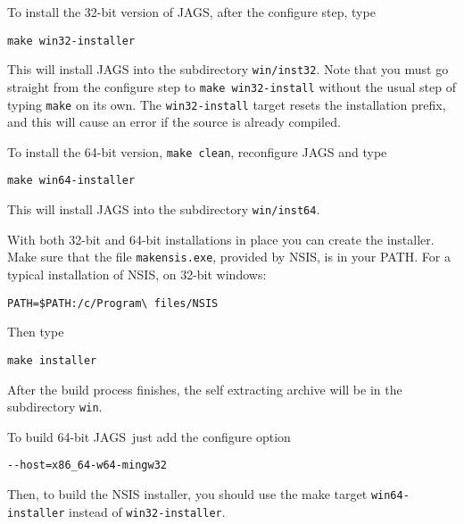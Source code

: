 \documentclass[11pt, a4paper, titlepage]{article}
\newcommand{\JAGS}{\textsf{JAGS}}
\begin{document}
To install the 32-bit version of JAGS, after the configure step, type
\begin{verbatim}
make win32-installer
\end{verbatim}
This will install JAGS into the subdirectory \verb+win/inst32+.
Note that you must go straight from the configure step to \texttt{make
  win32-install} without the usual step of typing \texttt{make} on
its own.  The \texttt{win32-install} target resets the installation
prefix, and this will cause an error if the source is already
compiled.

To install the 64-bit version, \verb+make clean+, reconfigure JAGS
and type 
\begin{verbatim}
make win64-installer
\end{verbatim}
This will install JAGS into the subdirectory \verb+win/inst64+.

With both 32-bit and 64-bit installations in place you can create the
installer. Make sure that the file \verb+makensis.exe+, provided by
NSIS, is in your PATH. For a typical installation of NSIS, on 32-bit
windows:
\begin{verbatim}
PATH=$PATH:/c/Program\ files/NSIS
\end{verbatim}
Then type
\begin{verbatim}
make installer
\end{verbatim}
After the build process finishes, the self extracting archive will be
in the subdirectory \verb+win+.


To build 64-bit \JAGS\, just add the configure option
\begin{verbatim}
--host=x86_64-w64-mingw32
\end{verbatim}

Then, to build the NSIS installer, you should use the make
target \verb+win64-installer+ instead of \verb+win32-installer+.
\end{document}
